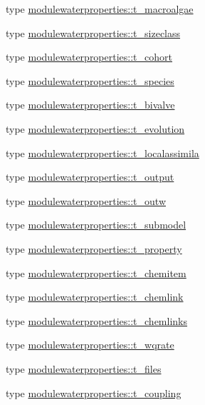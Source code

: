 \begin{DoxyCompactItemize}
\item 
type \mbox{\hyperlink{structmodulewaterproperties_1_1t__macroalgae}{modulewaterproperties\+::t\+\_\+macroalgae}}
\item 
type \mbox{\hyperlink{structmodulewaterproperties_1_1t__sizeclass}{modulewaterproperties\+::t\+\_\+sizeclass}}
\item 
type \mbox{\hyperlink{structmodulewaterproperties_1_1t__cohort}{modulewaterproperties\+::t\+\_\+cohort}}
\item 
type \mbox{\hyperlink{structmodulewaterproperties_1_1t__species}{modulewaterproperties\+::t\+\_\+species}}
\item 
type \mbox{\hyperlink{structmodulewaterproperties_1_1t__bivalve}{modulewaterproperties\+::t\+\_\+bivalve}}
\item 
type \mbox{\hyperlink{structmodulewaterproperties_1_1t__evolution}{modulewaterproperties\+::t\+\_\+evolution}}
\item 
type \mbox{\hyperlink{structmodulewaterproperties_1_1t__localassimila}{modulewaterproperties\+::t\+\_\+localassimila}}
\item 
type \mbox{\hyperlink{structmodulewaterproperties_1_1t__output}{modulewaterproperties\+::t\+\_\+output}}
\item 
type \mbox{\hyperlink{structmodulewaterproperties_1_1t__outw}{modulewaterproperties\+::t\+\_\+outw}}
\item 
type \mbox{\hyperlink{structmodulewaterproperties_1_1t__submodel}{modulewaterproperties\+::t\+\_\+submodel}}
\item 
type \mbox{\hyperlink{structmodulewaterproperties_1_1t__property}{modulewaterproperties\+::t\+\_\+property}}
\item 
type \mbox{\hyperlink{structmodulewaterproperties_1_1t__chemitem}{modulewaterproperties\+::t\+\_\+chemitem}}
\item 
type \mbox{\hyperlink{structmodulewaterproperties_1_1t__chemlink}{modulewaterproperties\+::t\+\_\+chemlink}}
\item 
type \mbox{\hyperlink{structmodulewaterproperties_1_1t__chemlinks}{modulewaterproperties\+::t\+\_\+chemlinks}}
\item 
type \mbox{\hyperlink{structmodulewaterproperties_1_1t__wqrate}{modulewaterproperties\+::t\+\_\+wqrate}}
\item 
type \mbox{\hyperlink{structmodulewaterproperties_1_1t__files}{modulewaterproperties\+::t\+\_\+files}}
\item 
type \mbox{\hyperlink{structmodulewaterproperties_1_1t__coupling}{modulewaterproperties\+::t\+\_\+coupling}}

\end{DoxyCompactItemize}
